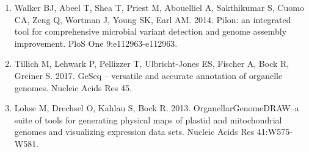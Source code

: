 \documentclass[titlepage,11pt, oneside]{article}   	%
\begin{document}
\begin{enumerate}
\item Walker BJ, Abeel T, Shea T, Priest M, Abouelliel A, Sakthikumar S, Cuomo CA, Zeng Q, Wortman J, Young SK, Earl AM. 2014. Pilon: an integrated tool for comprehensive microbial variant detection and genome assembly improvement. PloS One 9:e112963-e112963.
\item Tillich M, Lehwark P, Pellizzer T, Ulbricht-Jones ES, Fischer A, Bock R, Greiner S. 2017. GeSeq – versatile and accurate annotation of organelle genomes. Nucleic Acids Res 45.
\item Lohse M, Drechsel O, Kahlau S, Bock R. 2013. OrganellarGenomeDRAW--a suite of tools for generating physical maps of plastid and mitochondrial genomes and visualizing expression data sets. Nucleic Acids Res 41:W575-W581.
\end{enumerate}
\end{document}
